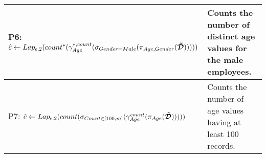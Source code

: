 \begin{table*}[t]
{\begin{tabular}{|l|l|}
P6:   $\hat{c} \leftarrow Lap_{\epsilon,2}(count^*(\gamma^{*,count}_{Age}(\sigma_{Gender=Male}(\pi_{Age , Gender}(\boldsymbol{\tilde{\mathcal{D}}})))))$ & Counts the number of distinct age values for the male employees.       \\ \hline
P7:  $\hat{c} \leftarrow Lap_{\epsilon,2}(count(\sigma_{Count\in[100,m]}(\gamma^{count}_{Age}(\pi_{Age}(\boldsymbol{\tilde{\mathcal{D}}})))))$
                                     & Counts   the number of  age values having at least 100 records.   \\ \hline

\end{tabular}}
\end{table*}
